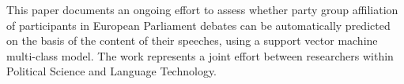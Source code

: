 This paper documents an ongoing effort to assess whether party group affiliation of participants in European Parliament debates can be automatically predicted on the basis of the content of their speeches, using a support vector machine multi-class model. The work represents a joint effort between researchers within Political Science and Language Technology.
